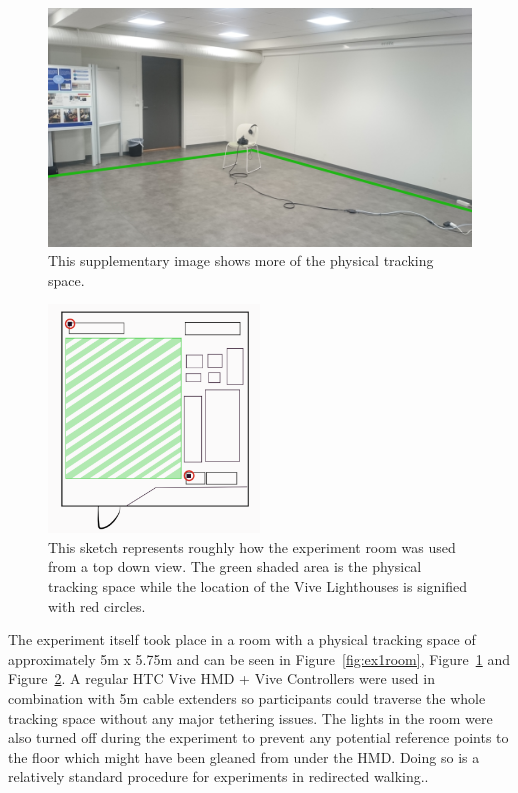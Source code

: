 \begin{figure}[tbph]
    \centering
    \includegraphics[width=1\textwidth]{figures/images/extraRoomImage.jpg}
    \caption[Supplementary Image of Experiment Environment]{This supplementary image shows more of the physical tracking space.}
    \label{fig:ex1roomImage2}
\end{figure}

\begin{figure}[tbph]
    \centering
    \includegraphics[width=0.5\textwidth]{figures/images/topDownRoom.png}
    \caption[Top Down Representation of Experiment Environment]{This sketch represents roughly how the experiment room was used from a top down view. The green shaded area is the physical tracking space while the location of the Vive Lighthouses is signified with red circles.}
    \label{fig:ex1roomTopDown}
\end{figure}

The experiment itself took place in a room with a physical tracking space of approximately 5m x 5.75m and can be seen in Figure~\ref{fig:ex1room}, Figure~\ref{fig:ex1roomImage2} and Figure~\ref{fig:ex1roomTopDown}. A regular HTC Vive HMD + Vive Controllers were used in combination with 5m cable extenders so participants could traverse the whole tracking space without any major tethering issues. The lights in the room were also turned off during the experiment to prevent any potential reference points to the floor which might have been gleaned from under the HMD. Doing so is a relatively standard procedure for experiments in redirected walking.. 

